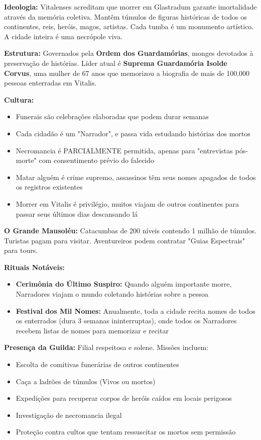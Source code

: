\textbf{\ringmfamily Ideologia:} Vitalenses acreditam que morrer em Glastradum garante imortalidade através da memória coletiva. Mantêm túmulos de figuras históricas de todos os continentes, reis, heróis, magos, artistas. Cada tumba é um monumento artístico. A cidade inteira é uma necrópole viva.

\textbf{\ringmfamily Estrutura:} Governados pela \textbf{Ordem dos Guardamórias}, monges devotados à preservação de histórias. Líder atual é \textbf{Suprema Guardamória Isolde Corvus}, uma mulher de 67 anos que memorizou a biografia de mais de 100.000 pessoas enterradas em Vitalis.

\textbf{\ringmfamily Cultura:}
\begin{itemize}
    \item Funerais são celebrações elaboradas que podem durar semanas
    \item Cada cidadão é um "Narrador", e passa vida estudando histórias dos mortos
    \item Necromancia é PARCIALMENTE permitida, apenas para "entrevistas pós-morte" com consentimento prévio do falecido
    \item Matar alguém é crime supremo, assassinos têm seus nomes apagados de todos os registros existentes
    \item Morrer em Vitalis é privilégio, muitos viajam de outros continentes para passar seus últimos dias descansando lá
\end{itemize}

\textbf{\ringmfamily O Grande Mausoléu:} Catacumbas de 200 níveis contendo 1 milhão de túmulos. Turistas pagam para visitar. Aventureiros podem contratar "Guias Espectrais" para tours.

\textbf{\ringmfamily Rituais Notáveis:}
\begin{itemize}
    \item \textbf{\ringmfamily Cerimônia do Último Suspiro:} Quando alguém importante morre, Narradores viajam o mundo coletando histórias sobre a pessoa
    \item \textbf{\ringmfamily Festival dos Mil Nomes:} Anualmente, toda a cidade recita nomes de todos os enterrados (dura 3 semanas ininterruptas), onde todos os Narradores recebem listas de nomes para memorizar e recitar
\end{itemize}

\textbf{\ringmfamily Presença da Guilda:} Filial respeitosa e solene. Missões incluem:
\begin{itemize}
    \item Escolta de comitivas funerárias de outros continentes
    \item Caça a ladrões de túmulos (Vivos ou mortos)
    \item Expedições para recuperar corpos de heróis caídos em locais perigosos
    \item Investigação de necromancia ilegal
    \item Proteção contra cultos que tentam ressuscitar os mortos sem permissão
\end{itemize}

